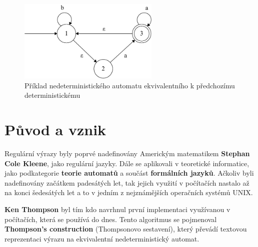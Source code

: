 \begin{figure}[!h]
	\centering
	\includegraphics[width=0.6\textwidth]{Figures/NFA_example.pdf}
	\caption{Příklad nedeterministického automatu ekvivalentního k předchozímu deterministickému}
	\label{fig:NFAex}
\end{figure}

\section{Původ a vznik}
Regulární výrazy byly poprvé nadefinovány Americkým matematikem \textbf{Stephan Cole Kleene}, jako regulární jazyky. 
Dále se aplikovali v teoretické informatice, jako podkategorie \textbf{teorie automatů} a součást \textbf{formálních jazyků}.
Ačkoliv byli nadefinovány začátkem padesátých let, tak jejich využití v počítačích nastalo až na konci šedesátých let a to v 
jedním z nejznámějších operačních systémů UNIX.

\textbf{Ken Thompson} byl tím kdo navrhnul první implementaci využívanou v počítačích, která se používá do dnes. 
Tento algoritmus se pojmenoval \textbf{Thompson's construction} (Thompsonovo sestavení), který převádí textovou reprezentaci výrazu na ekvivalentní nedeterministický automat.